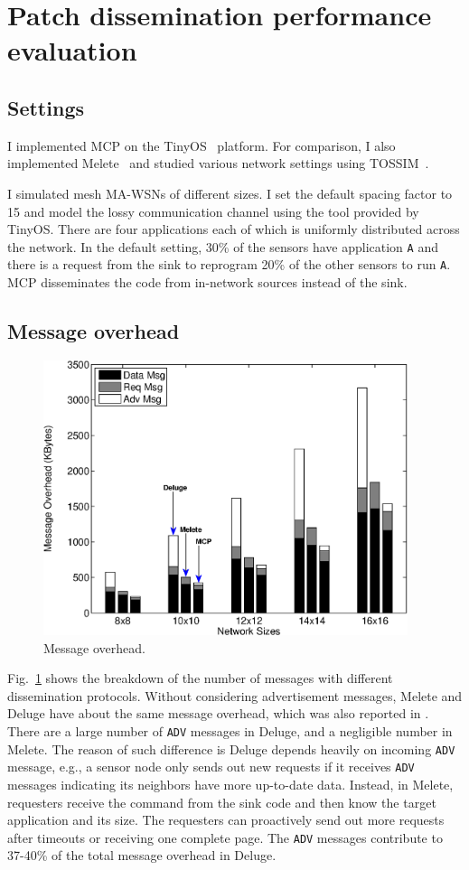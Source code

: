 \section{Patch dissemination performance evaluation}
\subsection{Settings}
I implemented MCP on the TinyOS~\cite{tinyos} platform. For comparison, I also implemented Melete~\cite{melete} and studied various network settings using TOSSIM~\cite{tossim}. 

I simulated mesh MA-WSNs of different sizes. I set the default spacing factor to 15 and model the lossy communication channel using the tool provided by TinyOS. There are four applications each of which is uniformly distributed across the network. In the default setting, 30\% of the sensors have application {\tt A} and there is a request from the sink to reprogram 20\% of the other sensors to run {\tt A}. MCP disseminates the code from in-network sources instead of the sink. 

\subsection{Message overhead}

\begin{figure}[htbp]
\centering
\includegraphics[width=4.2in]{figures/fsizes.eps}
\caption{Message overhead.}
\label{fmsg}
\end{figure}

Fig.~\ref{fmsg} shows the breakdown of the number of messages with different dissemination protocols. Without considering advertisement messages, Melete and Deluge have about the same message overhead, which was also reported in \cite{melete}. There are a large number of {\tt ADV} messages in Deluge, and a negligible number in Melete. The reason of such difference is Deluge depends heavily on incoming {\tt ADV} message, e.g., a sensor node only sends out new requests if it receives {\tt ADV} messages indicating its neighbors have more up-to-date data. Instead, in Melete, requesters receive the command from the sink code and then know the target application and its size. The requesters can proactively send out more requests after timeouts or receiving one complete page. The {\tt ADV} messages contribute to 37-40\% of the total message overhead in Deluge. 

